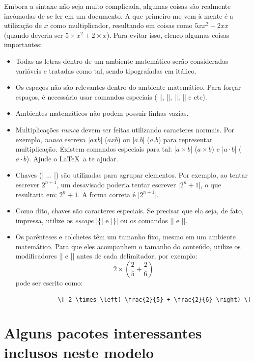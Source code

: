 \documentclass[12pt,oneside,a4paper,english,brazil]{abntex2}
\begin{document}
        Embora a sintaxe não seja muito complicada, algumas coisas são realmente incômodas de se ler em um documento. A que primeiro me vem à mente é a utilização de $ x $ como multiplicador, resultando em coisas como $ 5xx^2 + 2xx $ (quando deveria ser $ 5\times x^2 + 2\times x $). Para evitar isso, elenco algumas coisas importantes:
        \begin{itemize}
            \item Todas as letras dentro de um ambiente matemático serão consideradas variáveis e tratadas como tal, sendo tipografadas em itálico.
            \item Os espaços não são relevantes dentro do ambiente matemático. Para forçar espaços, é necessário usar comandos especiais (\ltx|\,|, \ltx|\;|, \ltx|\quad|, \ltx|\qquad| e etc).
            \item Ambientes matemáticos não podem possuir linhas vazias.
            \item Multiplicações \emph{nunca} devem ser feitas utilizando caracteres normais. Por exemplo, \emph{nunca} escreva \ltx|$ axb $| ($ axb $) ou \ltx|$ a.b $| ($ a.b $) para representar multiplicação. Existem comandos especiais para tal: \ltx|$ a \times b $| ($ a \times b $) e \ltx|$ a \cdot b $| ($ a \cdot b $). Ajude o \LaTeX\ a te ajudar.
            \item Chaves (\ltx|{ ... }|) são utilizadas para agrupar elementos. Por exemplo, ao tentar escrever $ 2^{n+1} $, um desavisado poderia tentar escrever \ltx|$ 2^n+1 $|, o que resultaria em: $ 2^n+1 $. A forma correta é \ltx|$ 2^{n+1} $|.
            \item Como dito, chaves são caracteres especiais. Se precisar que ela seja, de fato, impressa, utilize os \emph{escape} \ltx|\{| e \ltx|\}| ou os comandos \ltx|\lbrace| e \ltx|\rbrace|.
            \item Os parênteses e colchetes têm um tamanho fixo, mesmo em um ambiente matemático. Para que eles acompanhem o tamanho do conteúdo, utilize os modificadores \ltx|\left| e \ltx|\right| antes de cada delimitador, por exemplo:
            \[ 2 \times \left( \frac{2}{5} + \frac{2}{6} \right) \]
            pode ser escrito como:
            \begin{verbatim}
            \[ 2 \times \left( \frac{2}{5} + \frac{2}{6} \right) \]
            \end{verbatim}
        \end{itemize}

\chapter{Alguns pacotes interessantes inclusos neste modelo}
\end{document}
